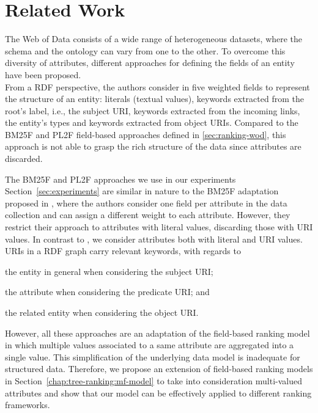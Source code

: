 \section{Related Work}
\label{sec:searching:relwork}

The Web of Data consists of a wide range of heterogeneous datasets, where the schema and the ontology can vary from one to the other. To overcome this diversity of attributes, different approaches for defining the fields of an entity have been proposed.\\

From a RDF perspective, the authors consider in \cite{Perez-Aguera:2010:UBS} five weighted fields to represent the structure of an entity: literals (textual values), keywords extracted from the root's label, i.e., the subject URI, keywords extracted from the incoming links, the entity's types and keywords extracted from object URIs. Compared to the BM25F and PL2F field-based approaches defined in \ref{sec:ranking-wod}, this approach is not able to grasp the rich structure of the data since attributes are discarded.

The BM25F and PL2F approaches we use in our experiments Section~\ref{sec:experiments} are similar in nature to the BM25F adaptation proposed in \cite{blanco:2011:iswc}, where the authors consider one field per attribute in the data collection and can assign a different weight to each attribute. However, they restrict their approach to attributes with literal values, discarding those with URI values. In contrast to \cite{blanco:2011:iswc}, we consider attributes both with literal and URI values. URIs in a RDF graph carry relevant keywords, with regards to
\begin{inparaenum}[(1)]
	\item the entity in general when considering the subject URI;
	\item the attribute when considering the predicate URI; and
	\item the related entity when considering the object URI.\\
\end{inparaenum}

However, all these approaches are an adaptation of the field-based ranking model in which multiple values associated to a same attribute are aggregated into a single value. This simplification of the underlying data model is inadequate for structured data. Therefore, we propose an extension of field-based ranking models in Section~\ref{chap:tree-ranking:mf-model} to take into consideration multi-valued attributes and show that our model can be effectively applied to different ranking frameworks.

